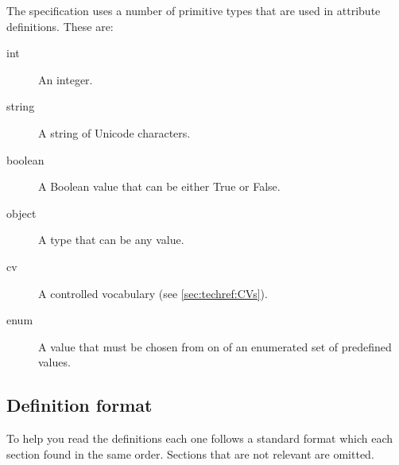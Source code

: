 %
The specification uses a number of primitive types that are used in
attribute definitions. These are:
\begin{description}
\item[int] An integer.
\item[string] A string of Unicode characters.
\item[boolean] A Boolean value that can be either True or False.
\item[object] A type that can be any value.
\item[cv] A controlled vocabulary (see \ref{sec:techref:CVs}).
\item[enum] A value that must be chosen from on of an enumerated set
  of predefined values.
\end{description}


\subsection{Definition format}

 To help you read the definitions each one follows a standard format
which each section found in the same order.  Sections that are not
relevant are omitted.

